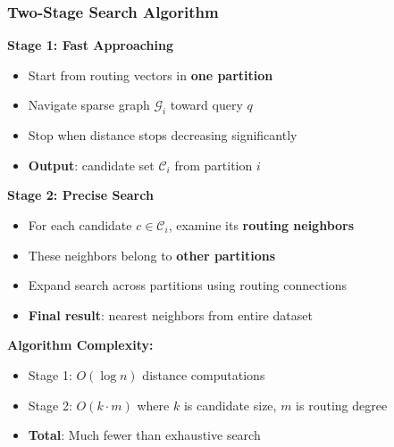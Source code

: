 \begin{frame}
\frametitle{Two-Stage Search Algorithm}

\textbf{Stage 1: Fast Approaching}
\begin{itemize}
\item Start from routing vectors in \textbf{one partition}
\item Navigate sparse graph $\mathcal{G}_i$ toward query $q$
\item Stop when distance stops decreasing significantly
\item \textbf{Output}: candidate set $\mathcal{C}_i$ from partition $i$
\end{itemize}

\vspace{5mm}
\textbf{Stage 2: Precise Search}
\begin{itemize}
\item For each candidate $c \in \mathcal{C}_i$, examine its \textbf{routing neighbors}
\item These neighbors belong to \textbf{other partitions}
\item Expand search across partitions using routing connections
\item \textbf{Final result}: nearest neighbors from entire dataset
\end{itemize}

\vspace{5mm}
\textbf{Algorithm Complexity:}
\begin{itemize}
\item Stage 1: $O(\log n)$ distance computations
\item Stage 2: $O(k \cdot m)$ where $k$ is candidate size, $m$ is routing degree
\item \textbf{Total}: Much fewer than exhaustive search
\end{itemize}
\end{frame}%
